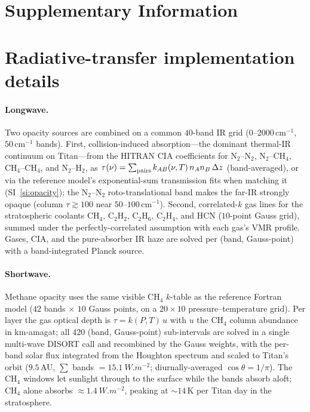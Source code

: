 \documentclass[11pt]{article}
\begin{document}
\clearpage
\appendix
\renewcommand{\thesection}{S\arabic{section}}
\setcounter{section}{0}
\section*{Supplementary Information}

\section{Radiative-transfer implementation details}
\label{si:rt}

\paragraph{Longwave.} Two opacity sources are combined on a common $40$-band IR
grid ($0$--$2000\,\mathrm{cm^{-1}}$, $50\,\mathrm{cm^{-1}}$ bands). First,
collision-induced absorption---the dominant thermal-IR continuum on Titan---from
the HITRAN CIA coefficients \citep{Karman2019} for N$_2$--N$_2$, N$_2$--CH$_4$,
CH$_4$--CH$_4$, and N$_2$--H$_2$, as $\tau(\nu)=\sum_{\rm pairs}
k_{AB}(\nu,T)\,n_A n_B\,\Delta z$ (band-averaged), or via the reference model's
exponential-sum transmission fits when matching it (SI~\ref{si:opacity}); the
N$_2$--N$_2$ roto-translational band makes the far-IR strongly opaque (column
$\tau\!\gtrsim\!100$ near $50$--$100\,\mathrm{cm^{-1}}$). Second, correlated-$k$
gas lines for the stratospheric coolants CH$_4$, C$_2$H$_2$, C$_2$H$_6$,
C$_2$H$_4$, and HCN ($10$-point Gauss grid), summed under the
perfectly-correlated assumption with each gas's VMR profile. Gases, CIA, and the
pure-absorber IR haze are solved per (band, Gauss-point) with a band-integrated
Planck source.

\paragraph{Shortwave.} Methane opacity uses the same visible CH$_4$ $k$-table as
the reference Fortran model ($42$ bands $\times$ $10$ Gauss points, on a
$20\times10$ pressure--temperature grid). Per layer the gas optical depth is
$\tau = k(P,T)\,u$ with $u$ the CH$_4$ column abundance in km-amagat; all $420$
(band, Gauss-point) sub-intervals are solved in a single multi-wave DISORT call
and recombined by the Gauss weights, with the per-band solar flux integrated
from the Houghton spectrum and scaled to Titan's orbit ($9.5$\,AU, $\sum$ bands
$=\SI{15.1}{W.m^{-2}}$; diurnally-averaged $\cos\theta=1/\pi$). The CH$_4$
windows let sunlight through to the surface while the bands absorb aloft;
CH$_4$ alone absorbs $\approx\!\SI{1.4}{W.m^{-2}}$, peaking at
$\sim\!14\,\mathrm{K}$ per Titan day in the stratosphere.
\end{document}
